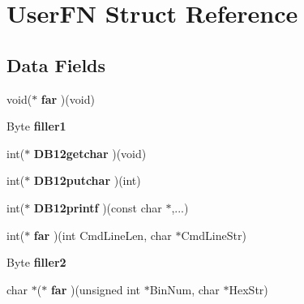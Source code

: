 \hypertarget{struct_user_f_n}{}\section{User\+F\+N Struct Reference}
\label{struct_user_f_n}
\subsection*{Data Fields}
\begin{DoxyCompactItemize}
\item 
\hypertarget{struct_user_f_n_a562051e0cb8c2ef004027916301787b0}{}void($\ast$ {\bfseries far} )(void)\label{struct_user_f_n_a562051e0cb8c2ef004027916301787b0}

\item 
\hypertarget{struct_user_f_n_a8e6848273feb93e3c1013241e1706ea2}{}Byte {\bfseries filler1}\label{struct_user_f_n_a8e6848273feb93e3c1013241e1706ea2}

\item 
\hypertarget{struct_user_f_n_a3dd3fb3d6427cae1d7f55a9aa8a27f6c}{}int($\ast$ {\bfseries D\+B12getchar} )(void)\label{struct_user_f_n_a3dd3fb3d6427cae1d7f55a9aa8a27f6c}

\item 
\hypertarget{struct_user_f_n_a07773f7fad0b758b56581377f9c83fb0}{}int($\ast$ {\bfseries D\+B12putchar} )(int)\label{struct_user_f_n_a07773f7fad0b758b56581377f9c83fb0}

\item 
\hypertarget{struct_user_f_n_a9dad72b1ad6b3628c5ff3e7c1dfaca5e}{}int($\ast$ {\bfseries D\+B12printf} )(const char $\ast$,...)\label{struct_user_f_n_a9dad72b1ad6b3628c5ff3e7c1dfaca5e}

\item 
\hypertarget{struct_user_f_n_ad6516b68d1840ca2e05ce8250cd9f979}{}int($\ast$ {\bfseries far} )(int Cmd\+Line\+Len, char $\ast$Cmd\+Line\+Str)\label{struct_user_f_n_ad6516b68d1840ca2e05ce8250cd9f979}

\item 
\hypertarget{struct_user_f_n_ab6529d06b5df9ea718217e24b762ac3e}{}Byte {\bfseries filler2}\label{struct_user_f_n_ab6529d06b5df9ea718217e24b762ac3e}

\item 
\hypertarget{struct_user_f_n_a0916a52ca5fda8c87c190baae9cb7370}{}char $\ast$($\ast$ {\bfseries far} )(unsigned int $\ast$Bin\+Num, char $\ast$Hex\+Str)\label{struct_user_f_n_a0916a52ca5fda8c87c190baae9cb7370}


\end{DoxyCompactItemize}
